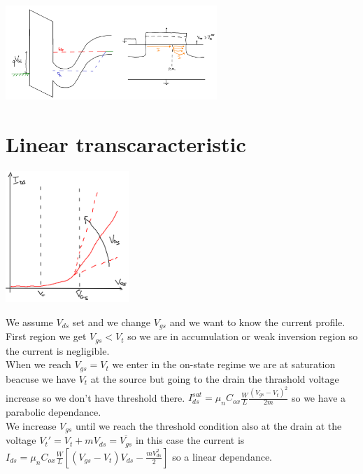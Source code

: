 \centering
\includegraphics[width=0.6\textwidth]{2delectro.png}\\
\raggedright

\section{Linear transcaracteristic}

\centering
\includegraphics[width=0.35\textwidth]{transcaracteristic.png}\\
\raggedright

We assume $V_{ds}$ set and we change $V_{gs}$ and we want to know the current profile.\\
First region we get $V_{gs}<V_{t}$ so we are in accumulation or weak inversion region so the current is negligible.\\
When we reach $V_{gs}=V_t$ we enter in the on-state regime we are at saturation beacuse we have $V_{t}$ at the source but going to the drain the thrashold voltage increase so we don't have threshold there. $I_{ds}^{sat}=\mu_nC_{ox}\frac{W}{L}\frac{(V_{gs}-V_t)^2}{2m}$ so we have a parabolic dependance.\\
We increase $V_{gs}$ until we reach the threshold condition also at the drain at the voltage $V_t'=V_t+m V_{ds}=\overline{V_{gs}}$  in this case the current is $I_{ds}=\mu_nC_{ox}\frac{W}{L}[(V_{gs}-V_t)V_{ds}-\frac{mV_{ds}^2}{2}]$ so a linear dependance.\\

